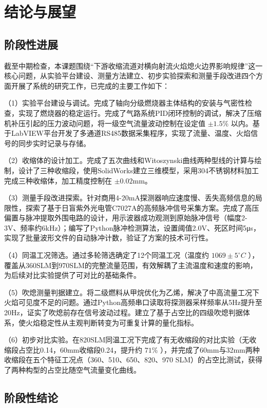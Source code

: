 
\chapter{结论与展望}

\section{阶段性进展}

截至中期检查，本课题围绕“下游收缩流道对横向射流火焰熄火边界影响规律”这一核心问题，从实验平台建设、测量方法建立、初步实验探索和测量手段改进四个方面开展了系统的研究工作，已完成的主要工作如下：

（1）实验平台建设与调试。完成了轴向分级燃烧器主体结构的安装与气密性检查，实现了燃烧器的稳定运行。完成了气路系统PID闭环控制的调试，解决了压缩机补压引起的压力波动问题，将一级空气流量波动控制在设定值 \(\pm 1.5\%\) 以内。基于LabVIEW平台开发了多通道RS485数据采集程序，实现了流量、温度、火焰信号的同步实时记录与存储。

（2）收缩体的设计加工。完成了五次曲线和Witoszynski曲线两种型线的计算与绘制，设计了三种收缩段，使用SolidWorks建立三维模型，采用304不锈钢材料加工完成三种收缩体，加工精度控制在 \(\pm 0.02\mathrm{mm}\)。

（3）测量手段改进探索。针对商用4-20mA探测器响应速度慢、丢失高频信息的局限性，探索了基于日盲紫外光电管C7027A的高频脉冲信号采集方案。完成了高压偏置与脉冲提取外围电路的设计，用示波器成功观测到原始脉冲信号（幅度2-3V、频率约6kHz）；编写了Python脉冲检测算法，设置阈值2.0V、死区时间5μs，实现了批量波形文件的自动脉冲计数，验证了方案的技术可行性。

（4）同温工况筛选。通过多轮筛选确定了12个同温工况（温度约 \(1069\pm 5^{\circ}C\) ），覆盖从360SLM到970SLM的完整流量范围，有效解耦了主流温度和速度的影响，为后续对比实验提供了可对比的基础条件。

（5）吹熄测量判据建立。将二级燃料从甲烷优化为乙烯，解决了中高流量工况下火焰可见度不足的问题。通过Python高频串口读取将探测器采样频率从5Hz提升至20Hz，证实了吹熄前存在信号波动过程。建立了基于占空比的四级吹熄判据体系，使火焰稳定性从主观判断转变为可重复计算的量化指标。

（6）初步对比实验。在820SLM同温工况下完成了有无收缩段的对比实验（无收缩段占空比0.14，60mm收缩段0.24，提升约 \(71\%\) ），并完成了60mm与32mm两种收缩段在五个特征工况点（360、510、650、820、970 SLM）的占空比测试，获得了两种构型的占空比随空气流量变化曲线。

\section{阶段性结论}

